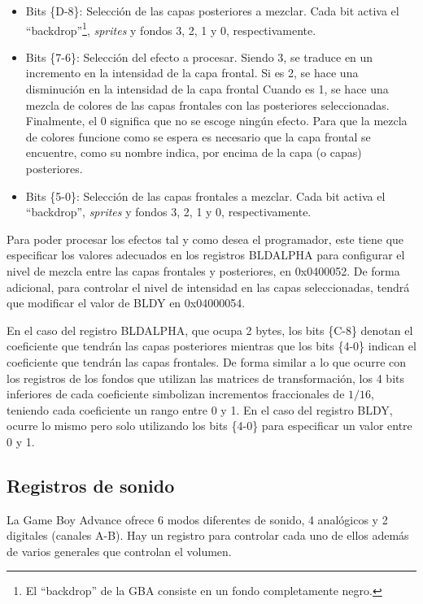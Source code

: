 \begin{itemize}
	\item Bits \{D-8\}: Selección de las capas posteriores a mezclar. Cada bit activa el ``backdrop''\footnote{El ``backdrop'' de la GBA consiste en un fondo completamente negro.}, \textit{sprites} y fondos 3, 2, 1 y 0, respectivamente.
	\item Bits \{7-6\}: Selección del efecto a procesar. Siendo 3, se traduce en un incremento en la intensidad de la capa frontal. Si es 2, se hace una disminución en la intensidad de la capa frontal Cuando es 1, se hace una mezcla de colores de las capas frontales con las posteriores seleccionadas. Finalmente, el 0 significa que no se escoge ningún efecto. Para que la mezcla de colores funcione como se espera es necesario que la capa frontal se encuentre, como su nombre indica, por encima de la capa (o capas) posteriores. 
	\item Bits \{5-0\}: Selección de las capas frontales a mezclar. Cada bit activa el ``backdrop'', \textit{sprites} y fondos 3, 2, 1 y 0, respectivamente.
\end{itemize}

Para poder procesar los efectos tal y como desea el programador, este tiene que especificar los valores adecuados en los registros BLDALPHA para configurar el nivel de mezcla entre las capas frontales y posteriores, en 0x0400052. De forma adicional, para controlar el nivel de intensidad en las capas seleccionadas, tendrá que modificar el valor de BLDY en 0x04000054.

En el caso del registro BLDALPHA, que ocupa 2 bytes, los bits \{C-8\} denotan el coeficiente que tendrán las capas posteriores mientras que los bits \{4-0\} indican el coeficiente que tendrán las capas frontales. De forma similar a lo que ocurre con los registros de los fondos que utilizan las matrices de transformación, los 4 bits inferiores de cada coeficiente simbolizan incrementos fraccionales de $1/16$, teniendo cada coeficiente un rango entre 0 y 1. En el caso del registro BLDY, ocurre lo mismo pero solo utilizando los bits \{4-0\} para especificar un valor entre 0 y 1.

\subsection{Registros de sonido}

La Game Boy Advance ofrece 6 modos diferentes de sonido, 4 analógicos y 2 digitales (canales A-B). Hay un registro para controlar cada uno de ellos además de varios generales que controlan el volumen.

